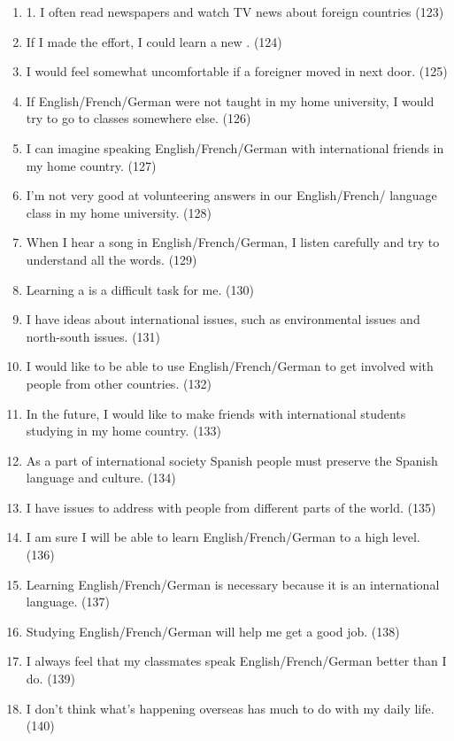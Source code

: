 \documentclass[output=paper]{langsci/langscibook}
\begin{document}
\begin{enumerate}
\item 1. I often read newspapers and watch TV news about foreign countries (123)
\item If I made the effort, I could learn a new . (124)
\item I would feel somewhat uncomfortable if a foreigner moved in next door. (125)
\item If {English}/French/{German} were not taught in my home university, I would try to go to classes somewhere else. (126)
\item I can imagine speaking {English}/French/{German} with international friends in my home country. (127)
\item I’m not very good at volunteering answers in our {English}/French/ language class in my home university. (128)
\item When I hear a song in {English}/French/{German}, I listen carefully and try to understand all the words. (129)
\item Learning a  is a difficult task for me. (130)
\item I have ideas about international issues, such as environmental issues and north-south issues. (131)
\item  I would like to be able to use {English}/French/{German} to get involved with people from other countries. (132)
\item  In the future, I would like to make friends with international students studying in my home country. (133)
\item  As a part of international society {Spanish} people must preserve the {Spanish} language and culture. (134)
\item  I have issues to address with people from different parts of the world. (135)
\item  I am sure I will be able to learn {English}/French/{German} to a high level. (136)
\item  Learning {English}/French/{German} is necessary because it is an international language. (137)
\item  Studying {English}/French/{German} will help me get a good job. (138)
\item  I always feel that my classmates speak {English}/French/{German} better than I do. (139)
\item  I don't think what's happening overseas has much to do with my daily life. (140)

\end{enumerate}
\end{document}
